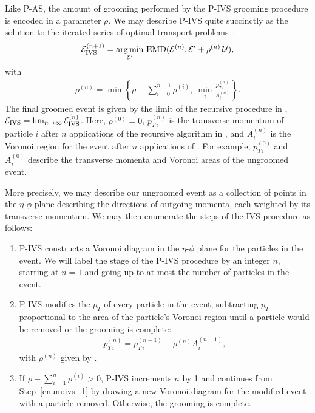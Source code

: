 Like P-AS, the amount of grooming performed by the P-IVS grooming procedure is encoded in a parameter \(\rho\).
%
We may describe P-IVS quite succinctly as the solution to the iterated series of optimal transport problems~\cite{Komiske:2020qhg}:
\begin{align}
    \mathcal{E}^{(n+1)}_{\rm IVS}
    =
    \underset{\mathcal{E}'}{\arg \min} ~ {\rm EMD}
    (\mathcal{E}^{(n)}, \mathcal{E}' + \rho^{(n)}\,\mathcal{U})
    \label{eqn:ivs1}
    ,
\end{align}
with
\begin{align}
    \rho^{(n)} =
    \min\left\{
    	\rho - \sum_{i=0}^{n-1}\rho^{(i)},
	~
	\min_i \frac{p^{(n)}_{T\,i}}{A^{(n)}_i}
    \right\}
    \label{eqn:ivs2}
    .
\end{align}
%
The final groomed event is given by the limit of the recursive procedure in , \(\mathcal{E}_{\rm IVS} = \lim_{n\to\infty} \mathcal{E}^{(n)}_{\rm IVS}\).
%
Here, \(\rho^{(0)} = 0\), \(p_{T\,i}^{(n)}\) is the transverse momentum of particle \(i\) after \(n\) applications of the recursive algorithm in , and \(A_i^{(n)}\) is the Voronoi region for the event after \(n\) applications of .
%
For example, \(p_{T\, i}^{(0)}\) and \(A_i^{(0)}\) describe the transverse momenta and Voronoi areas of the ungroomed event.

More precisely, we may describe our ungroomed event as a collection of points in the \(\eta\)-\(\phi\) plane describing the directions of outgoing momenta, each weighted by its transverse momentum.
%
We may then enumerate the steps of the IVS procedure as follows:
%
\begin{enumerate}
    \item
    P-IVS constructs a Voronoi diagram in the \(\eta\)-\(\phi\) plane for the particles in the event.
    We will label the stage of the P-IVS procedure by an integer \(n\), starting at \(n = 1\) and going up to at most the number of particles in the event.
    \label{enum:ivs_1}

    \item
    P-IVS modifies the \(p_T\) of every particle in the event, subtracting \(p_T\) proportional to the area of the particle's Voronoi region until a particle would be removed or the grooming is complete:
    \begin{align}
	\label{eqn:ivs_2}
	p_{T\,i}^{(n)} = p_{T\,i}^{(n-1)} - \rho^{(n)} A^{(n-1)}_i,
    \end{align}
    with \(\rho^{(n)}\) given by .
    \label{enum:ivs_2}

    \item
    If \(\rho - \sum_{i = 1}^n \rho^{(i)} > 0\), P-IVS increments \(n\) by 1 and continues from Step~\ref{enum:ivs_1} by drawing a new Voronoi diagram for the modified event with a particle removed.
    Otherwise, the grooming is complete.
    \label{enum:ivs_3}
\end{enumerate}

